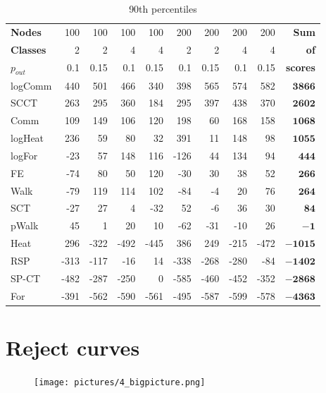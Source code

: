 \documentclass{article}
\begin{document}
\begin{table}[H]{\small
	\centering
	\begin{tabular}{lrrrrrrrrr}
		\toprule
\textbf{Nodes}   & 100&  100& 100&  100& 200&  200& 200&  200&{\textbf{Sum}}\\
\textbf{Classes} &   2&    2&   4&    4&   2&    2&   4&    4&{\textbf{  of}}\\
$p_{out}$        & 0.1&	0.15& 0.1& 0.15& 0.1& 0.15& 0.1& 0.15&{\textbf{scores}}\\
		\midrule
logComm & 440 & 501 & 466 & 340 & 398 & 565 & 574 & 582 & $\bm{3866}$\\
SCCT & 263 & 295 & 360 & 184 & 295 & 397 & 438 & 370 & $\bm{2602}$\\
Comm & 109 & 149 & 106 & 120 & 198 & 60 & 168 & 158 & $\bm{1068}$\\
logHeat & 236 & 59 & 80 & 32 & 391 & 11 & 148 & 98 & $\bm{1055}$\\
logFor & -23 & 57 & 148 & 116 & -126 & 44 & 134 & 94 & $\bm{444}$\\
FE & -74 & 80 & 50 & 120 & -30 & 30 & 38 & 52 & $\bm{266}$\\
Walk & -79 & 119 & 114 & 102 & -84 & -4 & 20 & 76 & $\bm{264}$\\
SCT & -27 & 27 & 4 & -32 & 52 & -6 & 36 & 30 & $\bm{84}$\\
pWalk & 45 & 1 & 20 & 10 & -62 & -31 & -10 & 26 &$\bm{-1}$\\
Heat & 296 & -322 & -492 & -445 & 386 & 249 & -215 & -472 & $\bm{-1015}$\\
RSP & -313 & -117 & -16 & 14 & -338 & -268 & -280 & -84 & $\bm{-1402}$\\
SP-CT & -482 & -287 & -250 & 0 & -585 & -460 & -452 & -352 & $\bm{-2868}$\\
For & -391 & -562 & -590 & -561 & -495 & -587 & -599 & -578 & $\bm{-4363}$\\
		\bottomrule
	\end{tabular}
	\caption{\label{t_CopComp} 90th percentiles}
}\end{table}

\newpage
\section{Reject curves}
\begin{figure}[H]
	\texttt{[image: pictures/4\_bigpicture.png]}
\end{figure}
\end{document}
